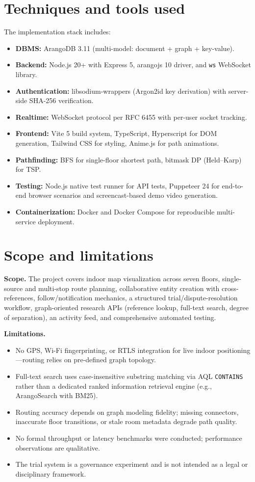 \documentclass[13pt,a4paper]{report}
\begin{document}
\section{Techniques and tools used}
The implementation stack includes:
\begin{itemize}
    \item \textbf{DBMS:} ArangoDB 3.11 (multi-model: document + graph + key-value).
    \item \textbf{Backend:} Node.js 20+ with Express 5, arangojs 10 driver, and \texttt{ws} WebSocket library.
    \item \textbf{Authentication:} libsodium-wrappers (Argon2id key derivation) with server-side SHA-256 verification.
    \item \textbf{Realtime:} WebSocket protocol per RFC 6455 \cite{rfc6455} with per-user socket tracking.
    \item \textbf{Frontend:} Vite 5 build system, TypeScript, Hyperscript for DOM generation, Tailwind CSS for styling, Anime.js for path animations.
    \item \textbf{Pathfinding:} BFS for single-floor shortest path, bitmask DP (Held--Karp) for TSP.
    \item \textbf{Testing:} Node.js native test runner for API tests, Puppeteer 24 for end-to-end browser scenarios and screencast-based demo video generation.
    \item \textbf{Containerization:} Docker and Docker Compose for reproducible multi-service deployment.
\end{itemize}

\section{Scope and limitations}
\textbf{Scope.} The project covers indoor map visualization across seven floors, single-source and multi-stop route planning, collaborative entity creation with cross-references, follow/notification mechanics, a structured trial/dispute-resolution workflow, graph-oriented research APIs (reference lookup, full-text search, degree of separation), an activity feed, and comprehensive automated testing.

\textbf{Limitations.}
\begin{itemize}
    \item No GPS, Wi-Fi fingerprinting, or RTLS integration for live indoor positioning---routing relies on pre-defined graph topology.
    \item Full-text search uses case-insensitive substring matching via AQL \texttt{CONTAINS} rather than a dedicated ranked information retrieval engine (e.g., ArangoSearch with BM25).
    \item Routing accuracy depends on graph modeling fidelity; missing connectors, inaccurate floor transitions, or stale room metadata degrade path quality.
    \item No formal throughput or latency benchmarks were conducted; performance observations are qualitative.
    \item The trial system is a governance experiment and is not intended as a legal or disciplinary framework.
\end{itemize}
\end{document}
